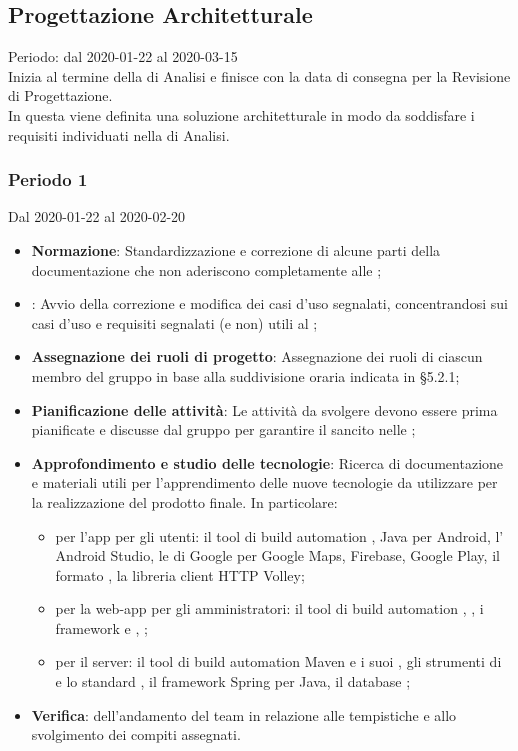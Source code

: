 \subsection{Progettazione Architetturale}
Periodo: dal 2020-01-22 al 2020-03-15\\
Inizia al termine della  di Analisi e finisce con la data di consegna per la Revisione di Progettazione.\\
In questa  viene definita una soluzione architetturale in modo da soddisfare i requisiti individuati nella  di Analisi.

\subsubsection{Periodo 1} 
Dal 2020-01-22 al 2020-02-20
\begin{itemize}
	\item \textbf{Normazione}: Standardizzazione e correzione di alcune parti della documentazione che non aderiscono completamente alle \NdP{};
	\item \textbf{\AdR{}}: Avvio della correzione e modifica dei casi d'uso segnalati, concentrandosi sui casi d'uso e requisiti segnalati (e non) utili al ;
	\item \textbf{Assegnazione dei ruoli di progetto}: Assegnazione dei ruoli di ciascun membro del gruppo in base alla suddivisione oraria indicata in §5.2.1;
	\item \textbf{Pianificazione delle attività}: Le attività da svolgere devono essere prima pianificate e discusse dal gruppo per garantire il  sancito nelle \NdP{};
	\item \textbf{Approfondimento e studio delle tecnologie}: Ricerca di documentazione e materiali utili per l'apprendimento delle nuove tecnologie da utilizzare per la realizzazione del prodotto finale.
	In particolare:
	\begin{itemize}
		\item per l'app per gli utenti: il tool di build automation , Java per Android, l' Android Studio, le  di Google per Google Maps, Firebase, Google Play, il formato , la libreria client HTTP Volley;
		\item per la web-app per gli amministratori: il tool di build automation , , i framework  e , ;
		\item per il server: il tool di build automation Maven e i suoi , gli strumenti di  e lo standard , il framework Spring per Java, il database ;
	\end{itemize}
	\item \textbf{Verifica}:  dell'andamento del team in relazione alle tempistiche e allo svolgimento dei compiti assegnati.
\end{itemize}
